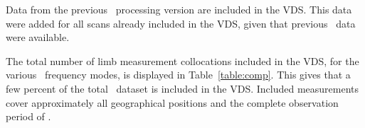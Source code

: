 Data from the previous \smr\ processing version are included in the VDS.
This data were added for all scans already included in the VDS,
given that previous \smr\ data were available.  

The total number of limb measurement collocations included in the VDS, for the various 
\smr\ frequency modes, is displayed in Table~\ref{table:comp}. This gives that a few 
percent of the total \smr\ dataset is included in the VDS. Included measurements cover 
approximately all geographical positions and the complete observation period of \smr.




 


